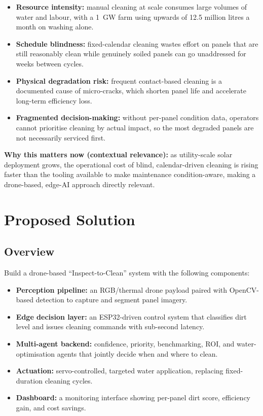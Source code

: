 \documentclass[11pt]{article}
\begin{document}
\begin{itemize}
    \item \textbf{Resource intensity:} manual cleaning at scale consumes large volumes of water and labour, with a 1~GW farm using upwards of 12.5 million litres a month on washing alone.
    \item \textbf{Schedule blindness:} fixed-calendar cleaning wastes effort on panels that are still reasonably clean while genuinely soiled panels can go unaddressed for weeks between cycles.
    \item \textbf{Physical degradation risk:} frequent contact-based cleaning is a documented cause of micro-cracks, which shorten panel life and accelerate long-term efficiency loss.
    \item \textbf{Fragmented decision-making:} without per-panel condition data, operators cannot prioritise cleaning by actual impact, so the most degraded panels are not necessarily serviced first.
\end{itemize}

\textbf{Why this matters now (contextual relevance):} as utility-scale solar deployment grows, the operational cost of blind, calendar-driven cleaning is rising faster than the tooling available to make maintenance condition-aware, making a drone-based, edge-AI approach directly relevant.

\section{Proposed Solution}

\subsection{Overview}
Build a drone-based ``Inspect-to-Clean'' system with the following components:
\begin{itemize}
    \item \textbf{Perception pipeline:} an RGB/thermal drone payload paired with OpenCV-based detection to capture and segment panel imagery.
    \item \textbf{Edge decision layer:} an ESP32-driven control system that classifies dirt level and issues cleaning commands with sub-second latency.
    \item \textbf{Multi-agent backend:} confidence, priority, benchmarking, ROI, and water-optimisation agents that jointly decide when and where to clean.
    \item \textbf{Actuation:} servo-controlled, targeted water application, replacing fixed-duration cleaning cycles.
    \item \textbf{Dashboard:} a monitoring interface showing per-panel dirt score, efficiency gain, and cost savings.
\end{itemize}
\end{document}
